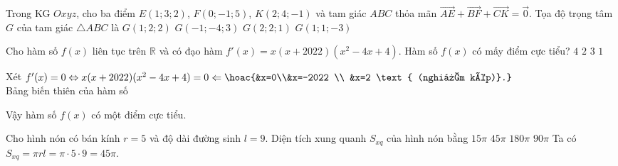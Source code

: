 \begin{ex}%
Trong KG $Oxyz$, cho ba điểm  $E(1;3;2)$, $F(0;-1;5)$, $K(2;4;-1)$ 
	 và tam giác $ABC$ thỏa mãn $\overrightarrow{AE}+\overrightarrow{BF}+\overrightarrow{CK}=\vec{0}$. Tọa độ trọng tâm $G$ của tam giác $\triangle ABC$ là
	\choice
	{\True $G(1;2;2)$}
	{$G(-1;-4;3)$}
	{$G(2;2;1)$}
	{$G(1;1;-3)$}
\end{ex}

\begin{ex}%
	Cho hàm số $f(x)$ liên tục trên $\mathbb{R}$ và có đạo hàm $f'(x)=x(x+2022)(x^2-4x+4)$. Hàm số $f(x)$ có mấy điểm cực tiểu?
	\choice
	{ $4$}
	{$2$}
	{$3$}
	{\True $1$}
	\loigiai
{ Xét $f'(x)=0 \Leftrightarrow x(x+2022)(x^2-4x+4) =0 \Leftarrow \hoac{&x=0\\&x=-2022 \\ &x=2 \text{ (nghiệm kép)}.}$\\
	Bảng biến thiên của hàm số\\
	\begin{center}
	\end{center}
Vậy hàm số $f(x)$ có một điểm cực tiểu.
	}
\end{ex}

\begin{ex}%
Cho hình nón có bán kính $r=5$ và độ dài đường sinh $l=9$. Diện tích xung quanh $S_{xq}$ của hình nón bằng
	\choice
	{ $15 \pi$}
	{\True $45 \pi$}
	{$180 \pi$}
	{$90 \pi$}
	\loigiai
{ Ta có $S_{xq}=\pi rl=\pi \cdot 5 \cdot 9 =45\pi$.
	}
\end{ex}

